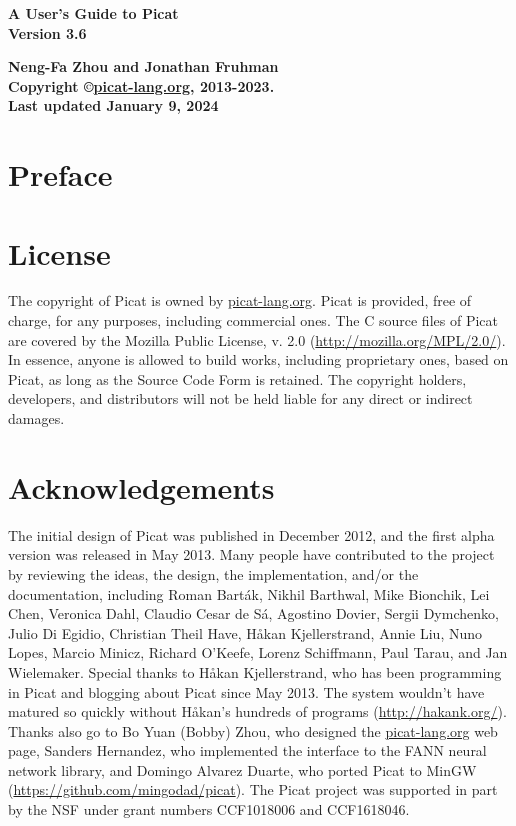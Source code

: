 \documentclass[11pt]{report}
\begin{document}
\vspace*{4cm}
\begin{center}
{\Huge\bf A User's Guide to Picat} \\
{\large\bf Version 3.6} \\


\vspace*{1cm}

{\large\bf Neng-Fa Zhou and Jonathan Fruhman} \\
\vspace*{1cm}
{\bf Copyright \copyright \url{picat-lang.org}, 2013-2023.} \\
{\bf Last updated January 9, 2024} \\
\end{center}
\thispagestyle{empty}
\clearpage

\pagestyle{plain}

\section*{Preface}


\clearpage
\section*{License}
The copyright of Picat is owned by \url{picat-lang.org}. Picat is provided, free of charge, for any purposes, including commercial ones. The C source files of Picat are covered by the Mozilla Public License, v. 2.0 (\url{http://mozilla.org/MPL/2.0/}). In essence, anyone is allowed to build works, including proprietary ones, based on Picat, as long as the Source Code Form is retained. The copyright holders, developers, and distributors will not be held liable for any direct or indirect damages.

 
\section*{Acknowledgements}
The initial design of Picat was published in December 2012, and the first alpha version was released in May 2013.  Many people have contributed to the project by reviewing the ideas, the design, the implementation, and/or the documentation, including Roman Bart\'{a}k, Nikhil Barthwal, Mike Bionchik, Lei Chen, Veronica Dahl, Claudio Cesar de S\'{a}, Agostino Dovier, Sergii Dymchenko, Julio Di Egidio, Christian Theil Have, H{\aa}kan Kjellerstrand,  Annie Liu, Nuno Lopes, Marcio Minicz, Richard O'Keefe, Lorenz Schiffmann, Paul Tarau, and Jan Wielemaker.  Special thanks to H{\aa}kan Kjellerstrand, who has been programming in Picat and blogging about Picat since May 2013. The system wouldn't have matured so quickly without H{\aa}kan's hundreds of programs (\url{http://hakank.org/}). Thanks also go to Bo Yuan (Bobby) Zhou, who designed the \url{picat-lang.org} web page, Sanders Hernandez, who implemented the interface to the FANN neural network library, and Domingo Alvarez Duarte, who ported Picat to MinGW (\url{https://github.com/mingodad/picat}). The Picat project was supported in part by the NSF under grant numbers CCF1018006 and CCF1618046.
\end{document}
